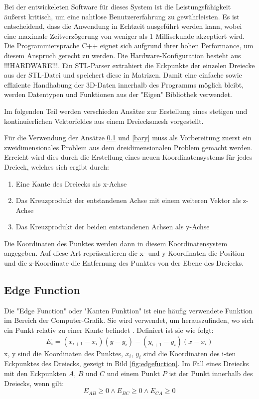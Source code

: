 \documentclass[conference]{IEEEtran}
\begin{document}
Bei der entwickeleten Software für dieses System ist die Leistungsfähigkeit äußerst kritisch, 
um eine nahtlose Benutzererfahrung zu gewährleisten. Es ist entscheidend, dass die Anwendung in 
Echtzeit ausgeführt werden kann, wobei eine maximale 
Zeitverzögerung von weniger als 1 Millisekunde akzeptiert wird. Die Programmiersprache 
C++ eignet sich aufgrund ihrer hohen Performance, um diesem Anspruch gerecht zu werden. 
Die Hardware-Konfiguration besteht aus !!!HARDWARE!!!.
Ein STL-Parser extrahiert die Eckpunkte der einzelen Dreiecke aus der STL-Datei und speichert diese in Matrizen. 
Damit eine einfache sowie effiziente Handhabung der 3D-Daten innerhalb des Programms möglich bleibt, werden 
Datentypen und Funktionen aus der "Eigen" Bibliothek verwendet. 

Im folgenden Teil werden verschieden Ansätze zur Erstellung eines stetigen und kontinuierlichen Vektorfeldes aus einem 
Dreiecksmesh vorgestellt. 

Für die Verwendung der Ansätze \ref*{edge} und \ref*{bary} muss als Vorbereitung zuerst ein zweidimensionales 
Problem aus dem dreidimensionalen Problem gemacht werden. Erreicht wird dies durch die Erstellung eines neuen 
Koordinatensystems für jedes Dreieck, welches sich ergibt durch:
\begin{enumerate}
    \item Eine Kante des Dreiecks als x-Achse
    \item Das Kreuzprodukt der entstandenen Achse mit einem weiteren Vektor als z-Achse
    \item Das Kreuzprodukt der beiden entstandenen Achsen als y-Achse
\end{enumerate}
Die Koordinaten des Punktes werden dann in diesem Koordinatensystem angegeben. Auf diese Art 
repräsentieren die x- und y-Koordinaten die Position und die z-Koordinate die Entfernung des Punktes 
von der Ebene des Dreiecks. 

\subsection{Edge Function}\label{edge}
Die "Edge Function" oder "Kanten Funktion" ist eine häufig verwendete Funktion im Bereich der Computer-Grafik. Sie wird 
verwendet, um herauszufinden, wo sich ein Punkt relativ zu einer Kante befindet \autocite{pinedaParallelAlgorithmPolygon1988}. 
Definiert ist sie wie folgt:
\begin{equation}
    E_{i} = (x_{i+1} - x_{i})(y - y_{i}) - (y_{i+1} - y_{i})(x - x_{i})
\end{equation}
x, y sind die Koordinaten des Punktes, $x_{i}$, $y_{i}$ sind die Koordinaten des i-ten Eckpunktes 
des Dreiecks, gezeigt in Bild \ref*{fig:edgefuction}.
Im Fall eines Dreiecks mit den Eckpunkten $A$, $B$ und $C$ und einem Punkt $P$ ist der Punkt innerhalb 
des Dreiecks, wenn gilt:
\begin{equation}
    E_{AB} \geq 0 \land E_{BC} \geq 0 \land E_{CA} \geq 0
\end{equation}
\end{document}
